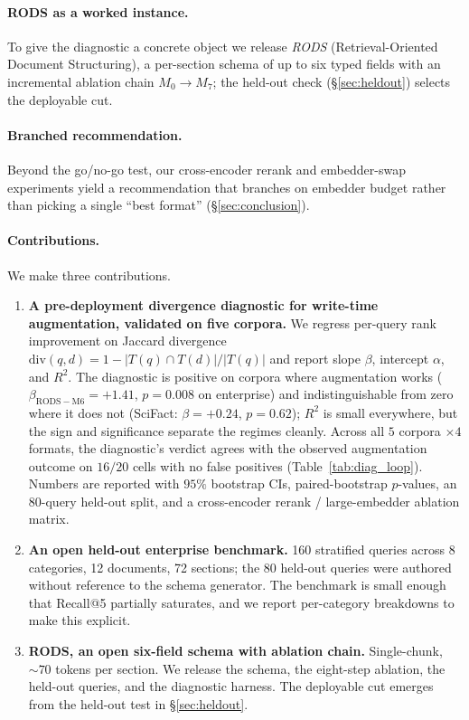 \documentclass[11pt]{article}
\begin{document}
\paragraph{RODS as a worked instance.} To give the diagnostic a
concrete object we release \emph{RODS} (Retrieval-Oriented Document
Structuring), a per-section schema of up to six typed fields with an
incremental ablation chain $M_0\to M_7$; the held-out check
(\S\ref{sec:heldout}) selects the deployable cut.

\paragraph{Branched recommendation.}
Beyond the go/no-go test, our cross-encoder rerank and embedder-swap
experiments yield a recommendation that branches on embedder budget
rather than picking a single ``best format'' (\S\ref{sec:conclusion}).

\paragraph{Contributions.} We make three contributions.
\begin{enumerate}[noitemsep,topsep=0.3em]
  \item \textbf{A pre-deployment divergence diagnostic for write-time
        augmentation, validated on five corpora.} We regress per-query
        rank improvement on Jaccard divergence
        $\mathrm{div}(q,d){=}1{-}|T(q){\cap} T(d)|/|T(q)|$ and report
        slope $\beta$, intercept $\alpha$, and $R^{2}$. The diagnostic
        is positive on corpora where augmentation works
        ($\beta_{\mathrm{RODS-M6}}{=}{+}1.41$, $p{=}0.008$ on enterprise)
        and indistinguishable from zero where it does not (SciFact:
        $\beta{=}{+}0.24$, $p{=}0.62$); $R^{2}$ is small everywhere,
        but the sign and significance separate the regimes cleanly.
        Across all $5$ corpora $\times 4$ formats, the diagnostic's
        verdict agrees with the observed augmentation outcome on
        $16/20$ cells with no false positives (Table~\ref{tab:diag_loop}).
        Numbers are reported with $95\%$ bootstrap CIs, paired-bootstrap
        $p$-values, an $80$-query held-out split, and a cross-encoder
        rerank / large-embedder ablation matrix.
  \item \textbf{An open held-out enterprise benchmark.} 160 stratified
        queries across 8 categories, 12 documents, 72 sections; the
        80 held-out queries were authored without reference to the
        schema generator. The benchmark is small enough that
        Recall@5 partially saturates, and we report per-category
        breakdowns to make this explicit.
  \item \textbf{RODS, an open six-field schema with ablation chain.}
        Single-chunk, $\sim 70$ tokens per section. We release the
        schema, the eight-step ablation, the held-out queries, and
        the diagnostic harness. The deployable cut emerges from the
        held-out test in \S\ref{sec:heldout}.
\end{enumerate}
\end{document}

